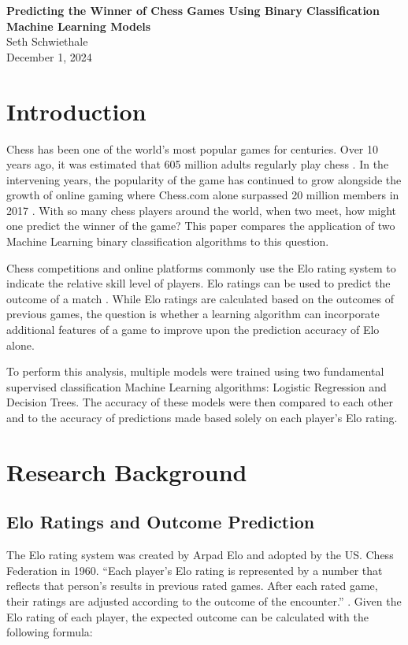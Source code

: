 \documentclass[12pt]{article}
\begin{document}
\begin{titlepage}
    \centering
    \vspace*{2in}
    {\Huge \bfseries Predicting the Winner of Chess Games Using Binary Classification Machine Learning Models \\[2in]}
    {\Large Seth Schwiethale \\[0.5in]}
    {\Large December 1, 2024 \\}
    \vfill
\end{titlepage}

\newpage
\tableofcontents
\newpage

\section{Introduction}
Chess has been one of the world's most popular games for centuries. Over 10 years ago, it was estimated that 605 million adults regularly play chess \cite{fidePressRelease2012}. In the intervening years, the popularity of the game has continued to grow alongside the growth of online gaming where Chess.com alone surpassed 20 million members in 2017 \cite{chessMembers}. With so many chess players around the world, when two meet, how might one predict the winner of the game? This paper compares the application of two Machine Learning binary classification algorithms to this question.

Chess competitions and online platforms commonly use the Elo rating system to indicate the relative skill level of players. Elo ratings can be used to predict the outcome of a match \cite[Elo Rating System]{chessElo}. While Elo ratings are calculated based on the outcomes of previous games, the question is whether a learning algorithm can incorporate additional features of a game to improve upon the prediction accuracy of Elo alone.

To perform this analysis, multiple models were trained using two fundamental supervised classification Machine Learning algorithms: Logistic Regression and Decision Trees. The accuracy of these models were then compared to each other and to the accuracy of predictions made based solely on each player's Elo rating.

\section{Research Background}

\subsection{Elo Ratings and Outcome Prediction}
The Elo rating system was created by Arpad Elo and adopted by the US. Chess Federation in 1960. ``Each player's Elo rating is represented by a number that reflects that person's results in previous rated games. After each rated game, their ratings are adjusted according to the outcome of the encounter.'' \cite[Elo Rating System]{chessElo}. Given the Elo rating of each player, the expected outcome can be calculated with the following formula:
\end{document}
